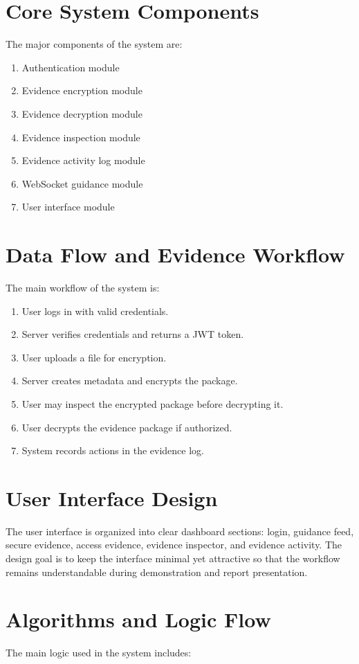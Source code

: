 \documentclass[12pt,a4paper]{report}
\begin{document}
\section{Core System Components}
The major components of the system are:

\begin{enumerate}
\item Authentication module
\item Evidence encryption module
\item Evidence decryption module
\item Evidence inspection module
\item Evidence activity log module
\item WebSocket guidance module
\item User interface module
\end{enumerate}

\section{Data Flow and Evidence Workflow}
The main workflow of the system is:

\begin{enumerate}
\item User logs in with valid credentials.
\item Server verifies credentials and returns a JWT token.
\item User uploads a file for encryption.
\item Server creates metadata and encrypts the package.
\item User may inspect the encrypted package before decrypting it.
\item User decrypts the evidence package if authorized.
\item System records actions in the evidence log.
\end{enumerate}

\section{User Interface Design}
The user interface is organized into clear dashboard sections: login, guidance feed, secure evidence, access evidence, evidence inspector, and evidence activity. The design goal is to keep the interface minimal yet attractive so that the workflow remains understandable during demonstration and report presentation.

\section{Algorithms and Logic Flow}
The main logic used in the system includes:
\end{document}
